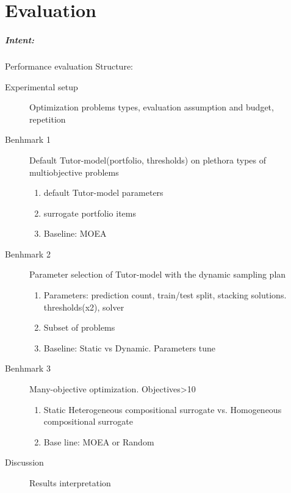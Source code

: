 \chapter{Evaluation}\label{sec:evaluation}


\begin{blockquote}
    \paragraph{Intent:} Performance evaluation 
    Structure:
    \begin{description}

        \item[Experimental setup] Optimization problems types, evaluation assumption and budget, repetition

        \item[Benhmark 1] Default Tutor-model(portfolio, thresholds) on plethora types of multiobjective problems
        \begin{enumerate}
            \item default Tutor-model parameters
            \item surrogate portfolio items
            \item Baseline: MOEA
        \end{enumerate}

        \item[Benhmark 2] Parameter selection of Tutor-model with the dynamic sampling plan
        \begin{enumerate}
            \item Parameters: prediction count, train/test split, stacking solutions. thresholds(x2), solver
            \item Subset of problems
            \item Baseline: Static vs Dynamic. Parameters tune
        \end{enumerate} 

        \item[Benhmark 3] Many-objective optimization. Objectives>10
        \begin{enumerate}
            \item Static Heterogeneous compositional surrogate vs. Homogeneous compositional surrogate
            \item Base line: MOEA or Random
        \end{enumerate}

        \item[Discussion] Results interpretation
    \end{description}
\end{blockquote}


